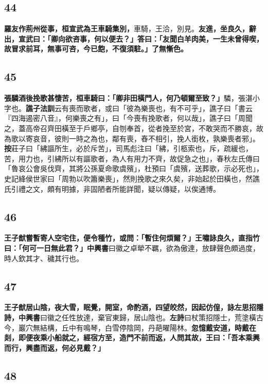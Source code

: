 \subsection*{44}

\textbf{羅友作荊州從事，桓宣武為王車騎集別，}{\footnotesize 車騎，王洽，別見。}\textbf{友進，坐良久，辭出，宣武曰：「卿向欲咨事，何以便去？」答曰：「友聞白羊肉美，一生未曾得喫，故冒求前耳，無事可咨，今已飽，不復須駐。」了無慚色。}

\subsection*{45}

\textbf{張驎酒後挽歌甚悽苦，桓車騎曰：「卿非田橫門人，何乃頓爾至致？」}{\footnotesize 驎，張湛小字也。\textbf{譙子法訓}云有喪而歌者，或曰「彼為樂喪也，有不可乎」，譙子曰「書云『四海遏密八音』，何樂喪之有」，曰「今喪有挽歌者，何以哉」，譙子曰「周聞之，蓋高帝召齊田橫至于戶鄉亭，自刎奉首，從者挽至於宮，不敢哭而不勝哀，故為歌以寄哀音，彼則一時之為也，鄰有喪，舂不相引，挽人銜枚，孰樂喪者邪」。\textbf{按}莊子曰「紼謳所生，必於斥苦」，司馬彪注曰「紼，引柩索也，斥，疏緩也，苦，用力也，引紼所以有謳歌者，為人有用力不齊，故促急之也」，春秋左氏傳曰「魯哀公會吳伐齊，其將公孫夏命歌虞殯」，杜預曰「虞殯，送葬歌，示必死也」，史記絳侯世家曰「周勃以吹簫樂喪」，然則挽歌之來久矣，非始起於田橫也，然譙氏引禮之文，頗有明據，非固陋者所能詳聞，疑以傳疑，以俟通博。}

\subsection*{46}

\textbf{王子猷嘗暫寄人空宅住，便令種竹，或問：「暫住何煩爾？」王嘯詠良久，直指竹曰：「何可一日無此君？」}{\footnotesize \textbf{中興書}曰徽之卓犖不羈，欲為傲達，放肆聲色頗過度，時人欽其才、穢其行也。}

\subsection*{47}

\textbf{王子猷居山陰，夜大雪，眠覺，開室，命酌酒，四望皎然，因起仿偟，詠左思招隱詩，}{\footnotesize \textbf{中興書}曰徽之任性放達，棄官東歸，居山陰也。\textbf{左詩}曰杖策招隱士，荒塗橫古今，巖穴無結構，丘中有鳴琴，白雪停陰岡，丹葩曜陽林。}\textbf{忽憶戴安道，時戴在剡，即便夜乘小船就之，經宿方至，造門不前而返，人問其故，王曰：「吾本乘興而行，興盡而返，何必見戴？」}

\subsection*{48}

